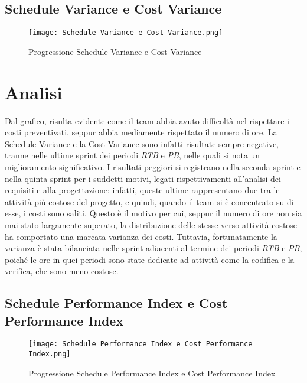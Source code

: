 \newpage

\subsection{Schedule Variance e Cost Variance}
\label{subsec:Schedule Variance e Cost Variance}

\begin{figure}[h] 
    \centering
    \texttt{[image: Schedule Variance e Cost Variance.png]}
    \caption{Progressione Schedule Variance e Cost Variance} 
    \label{fig: Schedule Variance e Cost Variance}
\end{figure}

\section*{Analisi}

Dal grafico, risulta evidente come il team abbia avuto difficoltà nel
rispettare i costi preventivati, seppur abbia mediamente rispettato il numero di ore. La Schedule Variance e la Cost Variance sono infatti
risultate sempre negative, tranne nelle ultime sprint dei periodi \emph{RTB} e \emph{PB}, nelle quali si nota un miglioramento
significativo. I risultati peggiori si registrano nella seconda sprint e nella quinta sprint per i suddetti
motivi, legati rispettivamenti all'analisi dei requisiti e alla progettazione: infatti, queste ultime rappresentano due tra le attività più costose del progetto, e quindi, quando il team si è concentrato su di esse, i costi sono saliti. Questo è il motivo per cui, seppur il numero di ore non sia mai stato largamente superato, la distribuzione delle stesse verso attività costose ha comportato una marcata varianza dei costi. Tuttavia, fortunatamente la varianza è stata bilanciata nelle sprint adiacenti al termine dei periodi \emph{RTB} e \emph{PB}, poiché le ore in quei periodi sono state dedicate ad attività come la codifica e la verifica, che sono meno costose.

\newpage

\subsection{Schedule Performance Index e Cost Performance Index}
\label{subsec:Schedule Performance Index e Cost Performance Index}

\begin{figure}[h] 
    \centering
    \texttt{[image: Schedule Performance Index e Cost Performance Index.png]}
    \caption{Progressione Schedule Performance Index e Cost Performance Index} 
    \label{fig: Schedule Performance Index e Cost Performance Index}
\end{figure}


